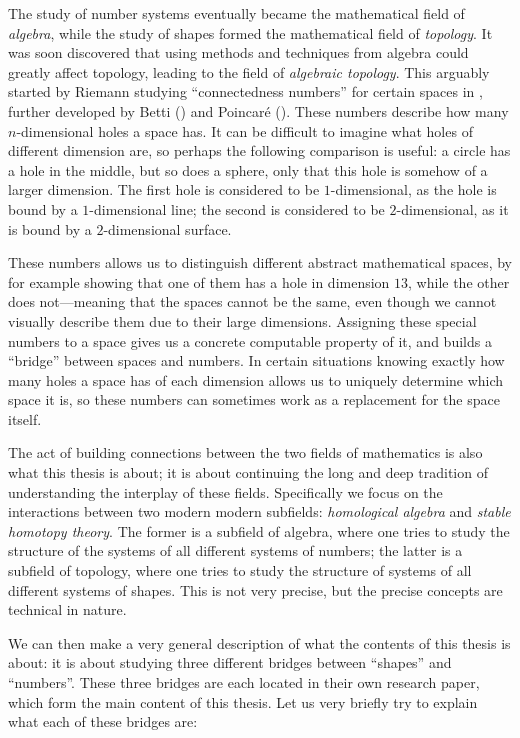 The study of number systems eventually became the mathematical field of \emph{algebra}, while the study of shapes formed the mathematical field of \emph{topology}. It was soon discovered that using methods and techniques from algebra could greatly affect topology, leading to the field of \emph{algebraic topology}. This arguably started by Riemann studying ``connectedness numbers'' for certain spaces in \cite{riemann_1857}, further developed by Betti (\cite{betti_1870}) and Poincaré (\cite{poincare_1895}). These numbers describe how many $n$-dimensional holes a space has. It can be difficult to imagine what holes of different dimension are, so perhaps the following comparison is useful: a circle has a hole in the middle, but so does a sphere, only that this hole is somehow of a larger dimension. The first hole is considered to be $1$-dimensional, as the hole is bound by a $1$-dimensional line; the second is considered to be $2$-dimensional, as it is bound by a $2$-dimensional surface. 

These numbers allows us to distinguish different abstract mathematical spaces, by for example showing that one of them has a hole in dimension $13$, while the other does not---meaning that the spaces cannot be the same, even though we cannot visually describe them due to their large dimensions. Assigning these special numbers to a space gives us a concrete computable property of it, and builds a ``bridge'' between spaces and numbers. In certain situations knowing exactly how many holes a space has of each dimension allows us to uniquely determine which space it is, so these numbers can sometimes work as a replacement for the space itself. 

The act of building connections between the two fields of mathematics is also what this thesis is about; it is about continuing the long and deep tradition of understanding the interplay of these fields. Specifically we focus on the interactions between two modern modern subfields: \emph{homological algebra} and \emph{stable homotopy theory}. The former is a subfield of algebra, where one tries to study the structure of the systems of all different systems of numbers; the latter is a subfield of topology, where one tries to study the structure of systems of all different systems of shapes. This is not very precise, but the precise concepts are technical in nature.

We can then make a very general description of what the contents of this thesis is about: it is about studying three different bridges between ``shapes'' and ``numbers''. These three bridges are each located in their own research paper, which form the main content of this thesis. Let us very briefly try to explain what each of these bridges are: 

